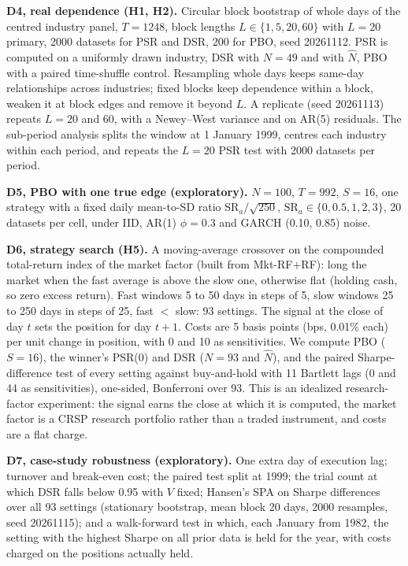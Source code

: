 \documentclass[11pt,a4paper]{article}
\newcommand{\SR}{\mathrm{SR}}
\begin{document}
\textbf{D4, real dependence (H1, H2).} Circular block bootstrap \citep{kunsch1989,politis1992circular} of whole days of the centred industry panel, $T=1248$, block lengths $L\in\{1,5,20,60\}$ with $L=20$ primary, 2000 datasets for PSR and DSR, 200 for PBO, seed 20261112. PSR is computed on a uniformly drawn industry, DSR with $N=49$ and with $\hat N$, PBO with a paired time-shuffle control. Resampling whole days keeps same-day relationships across industries; fixed blocks keep dependence within a block, weaken it at block edges and remove it beyond $L$. A replicate (seed 20261113) repeats $L=20$ and 60, with a Newey--West variance and on AR(5) residuals. The sub-period analysis splits the window at 1 January 1999, centres each industry within each period, and repeats the $L=20$ PSR test with 2000 datasets per period.

\textbf{D5, PBO with one true edge (exploratory).} $N=100$, $T=992$, $S=16$, one strategy with a fixed daily mean-to-SD ratio $\SR_a/\sqrt{250}$, $\SR_a\in\{0,0.5,1,2,3\}$, 20 datasets per cell, under IID, AR(1) $\phi=0.3$ and GARCH (0.10, 0.85) noise.

\textbf{D6, strategy search (H5).} A moving-average crossover on the compounded total-return index of the market factor (built from Mkt-RF$+$RF): long the market when the fast average is above the slow one, otherwise flat (holding cash, so zero excess return). Fast windows 5 to 50 days in steps of 5, slow windows 25 to 250 days in steps of 25, fast $<$ slow: 93 settings. The signal at the close of day $t$ sets the position for day $t+1$. Costs are 5 basis points (bps, 0.01\% each) per unit change in position, with 0 and 10 as sensitivities. We compute PBO ($S=16$), the winner's PSR(0) and DSR ($N=93$ and $\hat N$), and the paired Sharpe-difference test of every setting against buy-and-hold with 11 Bartlett lags (0 and 44 as sensitivities), one-sided, Bonferroni over 93. This is an idealized research-factor experiment: the signal earns the close at which it is computed, the market factor is a CRSP research portfolio rather than a traded instrument, and costs are a flat charge.

\textbf{D7, case-study robustness (exploratory).} One extra day of execution lag; turnover and break-even cost; the paired test split at 1999; the trial count at which DSR falls below 0.95 with $V$ fixed; Hansen's SPA on Sharpe differences over all 93 settings (stationary bootstrap, mean block 20 days, 2000 resamples, seed 20261115); and a walk-forward test in which, each January from 1982, the setting with the highest Sharpe on all prior data is held for the year, with costs charged on the positions actually held.
\end{document}
